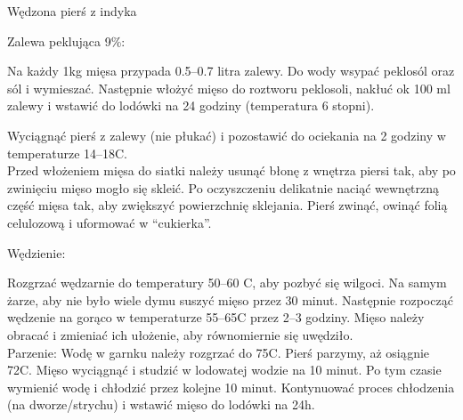 \documentclass[a4paper,12pt]{article}
\begin{document}
\newpage

\begin{recipe}{Wędzona pierś z indyka}{}{}

\freeform%
Zalewa peklująca 9\%:

\freeform%
Na każdy 1kg mięsa przypada 0.5--0.7 litra zalewy.
Do wody wsypać peklosól oraz sól i wymieszać.
Następnie włożyć mięso do roztworu peklosoli, nakłuć ok 100 ml zalewy i wstawić do lodówki na 24 godziny (temperatura 6 stopni). 

Wyciągnąć pierś z zalewy (nie płukać) i pozostawić do ociekania na 2 godziny w temperaturze 14--18\0C. \\
Przed włożeniem mięsa do siatki należy usunąć błonę z wnętrza piersi tak, aby po zwinięciu mięso mogło się skleić. Po oczyszczeniu delikatnie naciąć wewnętrzną część mięsa tak, aby zwiększyć powierzchnię sklejania.
Pierś zwinąć, owinąć folią celulozową i uformować w ``cukierka''.

Wędzienie:

Rozgrzać wędzarnie do temperatury 50--60 \0C, aby pozbyć się wilgoci.
Na samym żarze, aby nie było wiele dymu suszyć mięso przez 30 minut.
Następnie rozpocząć wędzenie na gorąco w temperaturze 55--65\0C przez 2--3 godziny. 
Mięso należy obracać i zmieniać ich ułożenie, aby równomiernie się uwędziło. \\

Parzenie:
Wodę w garnku należy rozgrzać do 75\0C. Pierś parzymy, aż osiągnie 72\0C. 
Mięso wyciągnąć i studzić w lodowatej wodzie na 10 minut. Po tym czasie wymienić wodę i chłodzić przez kolejne 10 minut. Kontynuować proces chłodzenia (na dworze/strychu) i wstawić mięso do lodówki na 24h.

\end{recipe}

\newpage 
\end{document}
